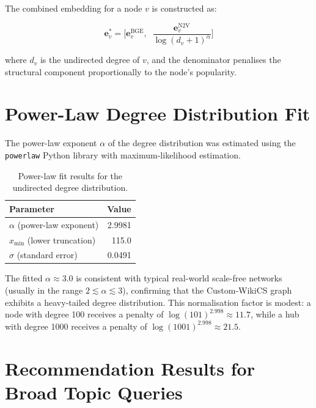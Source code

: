 \documentclass[12pt,a4paper]{article}
\begin{document}
The combined embedding for a node $v$ is constructed as:

\[
    \mathbf{e}_v^* = \bigl[\mathbf{e}_v^{\text{BGE}},\;\; \frac{\mathbf{e}_v^{\text{N2V}}}{\log(d_v+1)^{\alpha}}\bigr]
\]

where $d_v$ is the undirected degree of $v$, and the denominator penalises
the structural component proportionally to the node's popularity.

\section{Power-Law Degree Distribution Fit}

The power-law exponent $\alpha$ of the degree distribution was estimated
using the \texttt{powerlaw} Python library with maximum-likelihood estimation.

\begin{table}[H]
\centering
\caption{Power-law fit results for the undirected degree distribution.}
\label{tab:powerlaw}
\begin{tabular}{lr}
\toprule
\textbf{Parameter} & \textbf{Value} \\
\midrule
$\alpha$ (power-law exponent) & 2.9981 \\
$x_{\min}$ (lower truncation) & 115.0 \\
$\sigma$ (standard error)     & 0.0491 \\
\bottomrule
\end{tabular}
\end{table}

The fitted $\alpha \approx 3.0$ is consistent with typical real-world
scale-free networks (usually in the range $2 \lesssim \alpha \lesssim 3$),
confirming that the Custom-WikiCS graph exhibits a heavy-tailed degree
distribution.  This normalisation factor is modest: a node with degree 100
receives a penalty of $\log(101)^{2.998} \approx 11.7$, while a hub with
degree 1000 receives a penalty of $\log(1001)^{2.998} \approx 21.5$.

\section{Recommendation Results for Broad Topic Queries}
\end{document}

